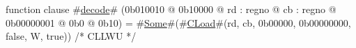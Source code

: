 function clause #\hyperref[zdecode]{decode}# (0b010010 @ 0b10000 @ rd : regno @ cb : regno @ 0b00000001 @ 0b0 @ 0b10) = #\hyperref[zSome]{Some}#(#\hyperref[zCLoad]{CLoad}#(rd, cb, 0b00000, 0b00000000, false, W, true)) /* CLLWU */
